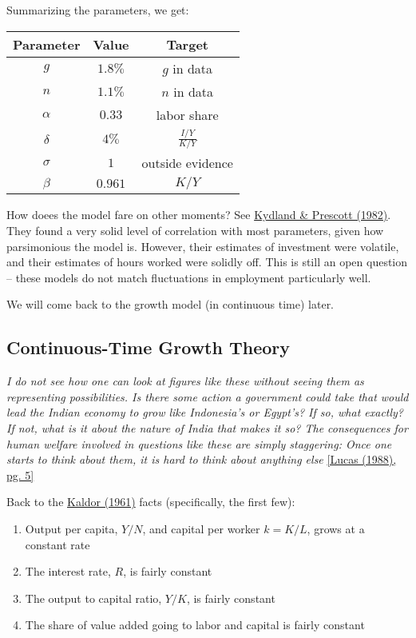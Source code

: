\documentclass[10pt]{article}
\begin{document}
\begin{example}
Summarizing the parameters, we get:
\smallskip
\begin{center}
	\begin{tabular}{ c | c | c}
	Parameter & Value & Target \\
	\hline 
	$g$ & $1.8\%$ & $g$ in data \\
	$n$ & $1.1\%$ & $n$ in data \\
	$\alpha$ & $0.33$ & labor share \\
	$\delta$ & $4\%$ & $\frac{I / Y}{K / Y}$ \\
	$\sigma$ & $1$ & outside evidence \\
	$\beta$ & $0.961$ & $K / Y$ \\
	\end{tabular}
\end{center}


\end{example}

\medskip
\begin{question}
	How doees the model fare on other moments? See \href{https://www.jstor.org/stable/1913386?origin=crossref}{Kydland \& Prescott (1982)}. They found a very solid level of correlation with most parameters, given how parsimonious the model is. However, their estimates of investment were volatile, and their estimates of hours worked were solidly off. This is still an open question -- these models do not match fluctuations in employment particularly well. 
\end{question}
We will come back to the growth model (in continuous time) later.

\newpage
\subsection{Continuous-Time Growth Theory}

	\emph{I do not see how one can look at figures like these without seeing them as representing possibilities. Is there some action a government could take that would lead the Indian economy to grow like Indonesia’s or Egypt’s? If so, what exactly? If not, what is it about the nature of India that makes it so? The consequences for human welfare involved in questions like these are simply staggering: Once one starts to think about them, it is hard to think about anything else} \href{https://www.parisschoolofeconomics.eu/docs/darcillon-thibault/lucasmechanicseconomicgrowth.pdf}{[Lucas (1988), pg. 5]}
	
	\medskip
	
	Back to the \href{https://link.springer.com/chapter/10.1007/978-1-349-08452-4_10}{Kaldor (1961)} facts (specifically, the first few):
\begin{enumerate}
	\item Output per capita, $Y / N$, and capital per worker $k = K / L$, grows at a constant rate
	\item The interest rate, $R$, is fairly constant
	\item The output to capital ratio, $Y / K$, is fairly constant
	\item The share of value added going to labor and capital is fairly constant
\end{enumerate}
\end{document}
